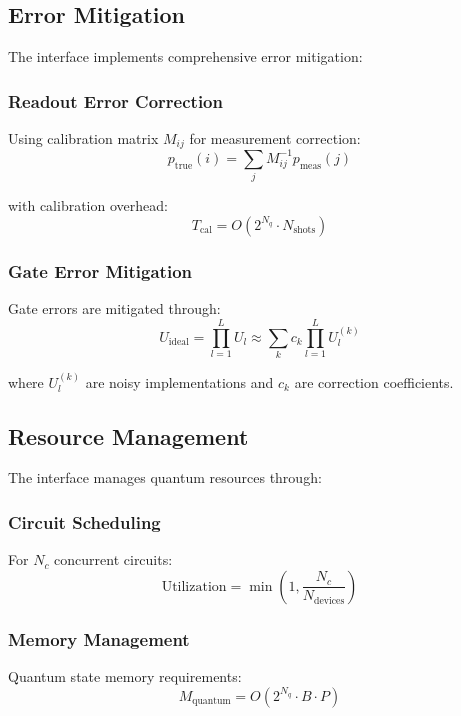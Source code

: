\documentclass{article}
\begin{document}
\subsection{Error Mitigation}
The interface implements comprehensive error mitigation:

\subsubsection{Readout Error Correction}
Using calibration matrix $M_{ij}$ for measurement correction:
\begin{equation}
p_{\text{true}}(i) = \sum_j M_{ij}^{-1} p_{\text{meas}}(j)
\end{equation}

with calibration overhead:
\begin{equation}
T_{\text{cal}} = O(2^{N_q} \cdot N_{\text{shots}})
\end{equation}

\subsubsection{Gate Error Mitigation}
Gate errors are mitigated through:
\begin{equation}
U_{\text{ideal}} = \prod_{l=1}^L U_l \approx \sum_k c_k \prod_{l=1}^L U_l^{(k)}
\end{equation}

where $U_l^{(k)}$ are noisy implementations and $c_k$ are correction coefficients.

\subsection{Resource Management}
The interface manages quantum resources through:

\subsubsection{Circuit Scheduling}
For $N_c$ concurrent circuits:
\begin{equation}
\text{Utilization} = \min\left(1, \frac{N_c}{N_{\text{devices}}}\right)
\end{equation}

\subsubsection{Memory Management}
Quantum state memory requirements:
\begin{equation}
M_{\text{quantum}} = O(2^{N_q} \cdot B \cdot P)
\end{equation}
\end{document}
